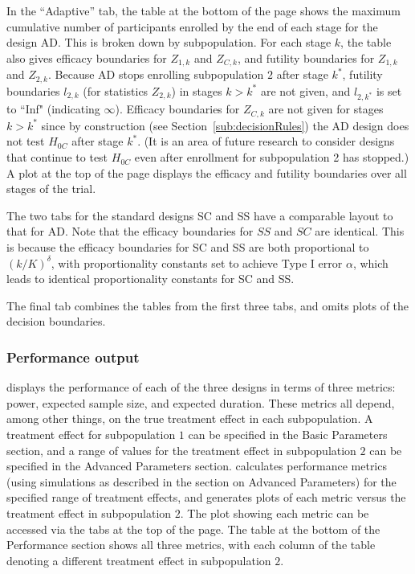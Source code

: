 \documentclass[article]{jss}
\begin{document}
In the ``Adaptive'' tab, the table at the bottom of the page shows the maximum cumulative number of participants enrolled by the end of each stage for the design AD. This is broken down by subpopulation. For each stage $k$, the table also gives efficacy boundaries for $Z_{1,k}$ and $Z_{C,k}$, and futility boundaries for $Z_{1,k}$ and $Z_{2,k}$. Because AD  stops enrolling subpopulation $2$ after stage $k^*$, futility boundaries $l_{2,k}$ (for statistics $Z_{2,k}$) in stages $k>k^*$  are not given, and $l_{2,k^*}$ is set to ``Inf" (indicating $\infty$). %
Efficacy boundaries for $Z_{C,k}$ are not given for stages $k>k^*$ since by construction (see Section~\ref{sub:decisionRules}) the AD design does not test $H_{0C}$ after stage $k^*$. (It is an area of future research to consider designs that continue to test $H_{0C}$ even after enrollment for subpopulation 2 has stopped.) A plot at the top of the page displays the efficacy and futility boundaries over all stages of the trial.

The two tabs for the standard designs SC and SS have a comparable layout to that for AD. Note that the efficacy boundaries for $SS$ and $SC$ are identical. This is because the efficacy boundaries for SC and SS are both proportional to $(k/K)^\delta$, with proportionality constants set to achieve Type I error $\alpha$, which leads to identical proportionality constants for SC and SS.

The final tab combines the tables from the first three tabs, and omits plots of the decision boundaries.


\subsubsection{Performance output}
\label{sub:performance-output}

 displays the performance of each of the three designs in terms of three metrics: power, expected sample size, and expected duration. These metrics all depend, among other things, on the true treatment effect in each subpopulation. A treatment effect for subpopulation $1$ can be specified in the Basic Parameters section, and a range of values for the treatment effect in subpopulation $2$ can be specified in the Advanced Parameters section.  calculates performance metrics (using simulations as described in the section on Advanced Parameters) for the specified range of treatment effects, and generates plots  of each metric versus the treatment effect in subpopulation $2$. The plot showing each metric can be accessed via the tabs at the top of the page. The table at the bottom of the Performance section shows all three metrics, with each column of the table denoting a different treatment effect in subpopulation $2$.
\end{document}
